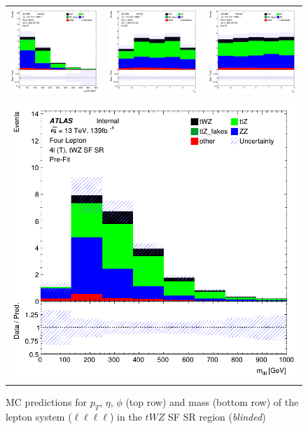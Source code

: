 \begin{figure}[htbp]
\centering
  \begin{tabular}{ccc}

    \includegraphics[width=.2\textwidth]{figures/PreFitPlots/lep4_tWZ_4T_SF_llll_sys_pt}&
    \includegraphics[width=.2\textwidth]{figures/PreFitPlots/lep4_tWZ_4T_SF_llll_sys_eta} &
    \includegraphics[width=.2\textwidth]{figures/PreFitPlots/lep4_tWZ_4T_SF_llll_sys_phi} \\
    \multicolumn{3}{c}{\includegraphics[width=.2\textwidth]{figures/PreFitPlots/lep4_tWZ_4T_SF_llll_sys_mass}}

  \end{tabular}
  \caption{MC predictions for $p_{T}$, $\eta$, $\phi$ (top row) and mass (bottom row) of the lepton system ($\ell \ell \ell \ell$) in the $tWZ$ SF SR region (\textit{blinded})}
  \label{fig:4lep-SF-SR-Lep-sys-Plots}
\end{figure}
\clearpage

